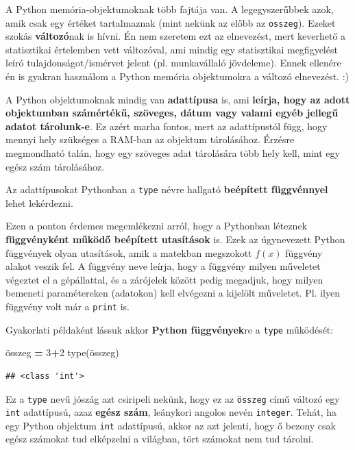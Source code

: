 \documentclass[
]{book}
\newenvironment{Shaded}{\begin{snugshade}}{\end{snugshade}}
\newcommand{\BuiltInTok}[1]{#1}
\newcommand{\DecValTok}[1]{\textcolor[rgb]{0.00,0.00,0.81}{#1}}
\newcommand{\NormalTok}[1]{#1}
\newcommand{\OperatorTok}[1]{\textcolor[rgb]{0.81,0.36,0.00}{\textbf{#1}}}
\begin{document}
A Python memória-objektumoknak több fajtája van. A legegyszerűbbek azok, amik csak egy értéket tartalmaznak (mint nekünk az előbb az \texttt{osszeg}). Ezeket szokás \textbf{változó}nak is hívni. Én nem szeretem ezt az elnevezést, mert keverhető a statisztikai értelemben vett változóval, ami mindig egy statisztikai megfigyelést leíró tulajdonságot/ismérvet jelent (pl. munkavállaló jövdeleme). Ennek ellenére én is gyakran használom a Python memória objektumokra a változó elnevezést. :)

A Python objektumoknak mindig van \textbf{adattípusa} is, ami \textbf{leírja, hogy az adott objektumban számértékű, szöveges, dátum vagy valami egyéb jellegű adatot tárolunk-e}. Ez azért marha fontos, mert az adattípustól függ, hogy mennyi hely szükséges a RAM-ban az objektum tárolásához. Érzésre megmondható talán, hogy egy szöveges adat tárolására több hely kell, mint egy egész szám tárolásához.

Az adattípusokat Pythonban a \texttt{type} névre hallgató \textbf{beépített függvénnyel} lehet lekérdezni.

Ezen a ponton érdemes megemlékezni arról, hogy a Pythonban léteznek \textbf{függvényként működő beépített utasítások} is. Ezek az úgynevezett Python függvények olyan utasítások, amik a matekban megszokott \(f(x)\) függvény alakot veszik fel.
A függvény neve leírja, hogy a függvény milyen műveletet végeztet el a gépállattal, és a zárójelek között pedig megadjuk, hogy milyen bemeneti paramétereken (adatokon) kell elvégezni a kijelölt műveletet. Pl. ilyen függvény volt már a \texttt{print} is.

Gyakorlati példaként lássuk akkor \textbf{Python függvények}re a \texttt{type} működését:

\begin{Shaded}
\begin{Highlighting}[]
\NormalTok{összeg }\OperatorTok{=} \DecValTok{3}\OperatorTok{+}\DecValTok{2}
\BuiltInTok{type}\NormalTok{(összeg)}
\end{Highlighting}
\end{Shaded}

\begin{verbatim}
## <class 'int'>
\end{verbatim}

Ez a \texttt{type} nevű jószág azt csiripeli nekünk, hogy ez az \texttt{összeg} című változó egy \texttt{int} adattípusú, azaz \textbf{egész szám}, leánykori angolos nevén \texttt{integer}. Tehát, ha egy Python objektum \texttt{int} adattípusú, akkor az azt jelenti, hogy ő bezony csak egész számokat tud elképzelni a világban, tört számokat nem tud tárolni.
\end{document}
